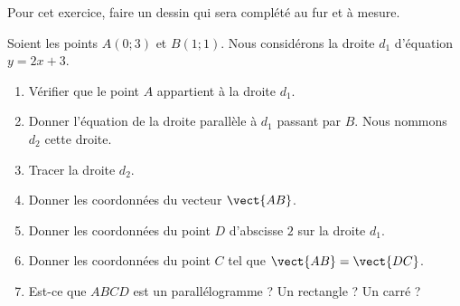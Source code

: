 
\begin{exercice}\label{exosmath-0694}

    Pour cet exercice, faire un dessin qui sera complété au fur et à mesure.

    Soient les points \( A(0;3)\) et \( B(1;1)\). Nous considérons la droite \( d_1\) d'équation \( y=2x+3\).
    \begin{multicols}{2}
    \begin{enumerate}
        \item
            Vérifier que le point \( A\) appartient à la droite \( d_1\).
        \item
            Donner l'équation de la droite parallèle à \( d_1\) passant par \( B\). Nous nommons \( d_2\) cette droite.
        \item
            Tracer la droite \( d_2\).
        \item
            Donner les coordonnées du vecteur \( \vect{ AB }\).
        \item
            Donner les coordonnées du point \( D\) d'abscisse \( 2\) sur la droite \( d_1\).
        \item
            Donner les coordonnées du point \( C\) tel que \( \vect{ AB }=\vect{ DC }\).
        \item
            Est-ce que \( ABCD\) est un parallélogramme ? Un rectangle ? Un carré ?
    \end{enumerate}
    \end{multicols}

\end{exercice}

